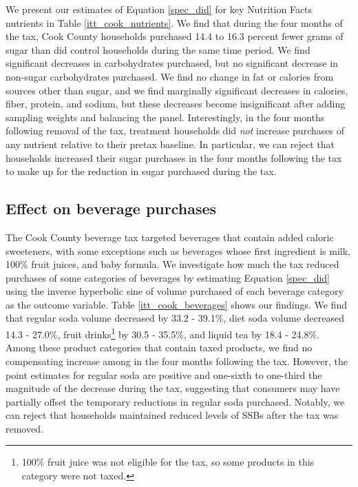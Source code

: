 \documentclass[12pt]{article}
\begin{document}
We present our estimates of Equation \ref{spec_did} for key Nutrition Facts nutrients in Table \ref{itt_cook_nutrients}. We find that during the four months of the tax, Cook County households purchased 14.4 to 16.3 percent fewer grams of sugar than did control households during the same time period. We find significant decreases in carbohydrates purchased, but no significant decrease in non-sugar carbohydrates purchased. We find no change in fat or calories from sources other than sugar, and we find marginally significant decreases in calories, fiber, protein, and sodium, but these decreases become insignificant after adding sampling weights and balancing the panel. Interestingly, in the four months following removal of the tax, treatment households did \textit{not} increase purchases of any nutrient relative to their pretax baseline. In particular, we can reject that households increased their sugar purchases in the four months following the tax to make up for the reduction in sugar purchased during the tax.

\subsection{Effect on beverage purchases}

The Cook County beverage tax targeted beverages that contain added caloric sweeteners, with some exceptions such as beverages whose first ingredient is milk, 100\% fruit juices, and baby formula. We investigate how much the tax reduced purchases of some categories of beverages by estimating Equation \ref{spec_did} using the inverse hyperbolic sine of volume purchased of each beverage category as the outcome variable. Table \ref{itt_cook_beverages} shows our findings. We find that regular soda volume decreased by 33.2 - 39.1\%, diet soda volume decreased 14.3 - 27.0\%, fruit drinks\footnote{100\% fruit juice was not eligible for the tax, so some products in this category were not taxed.} by 30.5 - 35.5\%, and liquid tea by 18.4 - 24.8\%.%
Among these product categories that contain taxed products, we find no compensating increase among in the four months following the tax. However, the point estimates for regular soda are positive and one-sixth to one-third the magnitude of the decrease during the tax, suggesting that consumers may have partially offset the temporary reductions in regular soda purchased. Notably, we can reject that households maintained reduced levels of SSBs after the tax was removed.
\end{document}
